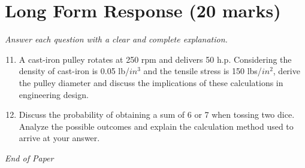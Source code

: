 \documentclass[12pt]{article}
\begin{document}
\section*{Long Form Response (20 marks)}
\textit{Answer each question with a clear and complete explanation.}
\begin{enumerate}[label=\arabic*.]
\setcounter{enumi}{10}
\item A cast-iron pulley rotates at 250 rpm and delivers 50 h.p. Considering the density of cast-iron is 0.05 lb/$in^3$ and the tensile stress is 150 lbs/$in^2$, derive the pulley diameter and discuss the implications of these calculations in engineering design.
\item Discuss the probability of obtaining a sum of 6 or 7 when tossing two dice. Analyze the possible outcomes and explain the calculation method used to arrive at your answer.
\end{enumerate}

\vfill
\noindent\textit{End of Paper}
\end{document}
